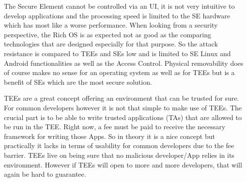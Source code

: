 The Secure Element cannot be controlled via an UI, it is not very intuitive
to develop applications and the processing speed is limited to the SE hardware
which has most like a worse performance. When looking from a security perspective, the Rich OS is as expected not as good as the comparing technologies that are designed especially for that purpose. So the attack resistance is compared to TEEs and SEs low and is limited to SE Linux and Android functionalities as well as the Access Control. Physical removability
does of course makes no sense for an operating system as well as for TEEs but
is a benefit of SEs which are the most secure solution.

TEEs are a great concept offering an environment that can be trusted for sure.
For common developers however it is not that simple to make use of TEEs.
The crucial part is to be able to write trusted applications (TAs) that are
allowed to be run in the TEE. Right now, a fee must be paid to receive the
necessary framework for writing those Apps. So in theory it is a nice concept
but practically it lacks in terms of usability for common developers due
to the fee barrier. TEEs live on being sure that no malicious developer/App relies in its environment. However if TEEs will open to more and more developers, that will again be hard to guarantee.






